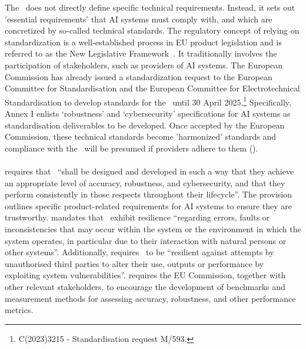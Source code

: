 The \EUAIAct\
does not directly define specific technical requirements. Instead, it sets out 'essential requirements' that AI systems must comply with, and which are concretized by so-called technical standards.
The regulatory concept of relying on standardization is a well-established process in EU product legislation and is referred to as the New Legislative Framework~\citep{gorywoda2009new}.
%
It traditionally involves the participation of stakeholders, such as providers of AI systems.
%
The European Commission has already issued a standardization request to the European Committee for Standardisation and the European Committee for Electrotechnical Standardisation to develop standards for the \EUAIAct\ until 30 April 2025.\footnote{C(2023)3215 - Standardisation request M/593.}
%
Specifically, Annex I enlists  `robustness' and `cybersecurity' specifications for AI systems as standardisation deliverables to be developed.
% 
Once accepted by the European Commission, these technical standards become 'harmonized' standards and compliance with the \EUAIAct\ will be presumed if providers adhere to them ().



\paragraph{} 
 requires that \HRAIS\ ``shall be designed and developed in such a way that they achieve an appropriate level of accuracy, robustness, and cybersecurity, and that they perform consistently in those respects throughout their lifecycle''.
%
The provision outlines specific product-related requirements for AI systems to ensure they are trustworthy.
%
 mandates that \HRAIS\ exhibit resilience ``regarding errors, faults or inconsistencies that may occur within the system or the environment in which the system operates, in particular due to their interaction with natural persons or other systems''.
%
Additionally,  requires \HRAIS\ to be ``resilient against attempts by unauthorised third parties to alter their use, outputs or performance by exploiting system
vulnerabilities''. 
%
 requires the EU Commission, together with other relevant stakeholders, to encourage the development of benchmarks and measurement methods for assessing accuracy, robustness, and other performance metrics.